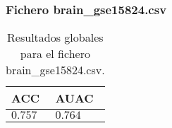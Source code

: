 \subsubsection{Fichero brain\_gse15824.csv}

\begin{table}[htp]
    \small
    \centering
    \begin{tabularx}{\columnwidth}{Y Y}
        ACC       & AUAC    \\\hline
        $0.757$   & $0.764$ \\\hline
    \end{tabularx}
    \caption{Resultados globales para el fichero brain\_gse15824.csv.}
    \label{tab:10}
\end{table}


